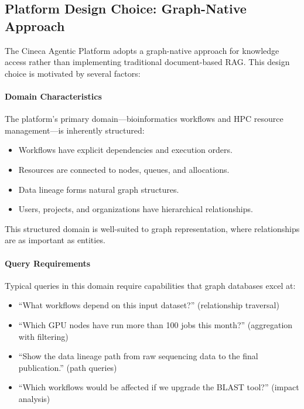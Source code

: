 \subsection{Platform Design Choice: Graph-Native Approach}

The Cineca Agentic Platform adopts a graph-native approach for knowledge access rather than implementing traditional document-based RAG. This design choice is motivated by several factors:

\paragraph{Domain Characteristics}

The platform's primary domain---bioinformatics workflows and HPC resource management---is inherently structured:

\begin{itemize}
    \item Workflows have explicit dependencies and execution orders.
    \item Resources are connected to nodes, queues, and allocations.
    \item Data lineage forms natural graph structures.
    \item Users, projects, and organizations have hierarchical relationships.
\end{itemize}

This structured domain is well-suited to graph representation, where relationships are as important as entities.

\paragraph{Query Requirements}

Typical queries in this domain require capabilities that graph databases excel at:

\begin{itemize}
    \item ``What workflows depend on this input dataset?'' (relationship traversal)
    \item ``Which GPU nodes have run more than 100 jobs this month?'' (aggregation with filtering)
    \item ``Show the data lineage path from raw sequencing data to the final publication.'' (path queries)
    \item ``Which workflows would be affected if we upgrade the BLAST tool?'' (impact analysis)
\end{itemize}

